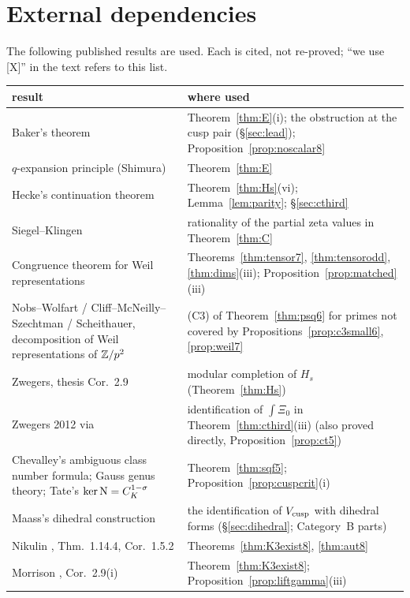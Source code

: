 \section{External dependencies}\label{sec:deps}
The following published results are used. Each is cited, not re-proved; ``we use [X]'' in the text refers to this list.
\begin{center}\small
\begin{longtable}{p{5.2cm}p{9.4cm}}\toprule
result & where used\\\midrule\endhead
Baker's theorem \cite{Baker} & Theorem~\ref{thm:E}(i); the obstruction at the cusp pair (\S\ref{sec:lead}); Proposition~\ref{prop:noscalar8}\\
$q$-expansion principle (Shimura) & Theorem~\ref{thm:E}\\
Hecke's continuation theorem \cite{Hecke} & Theorem~\ref{thm:Hs}(vi); Lemma~\ref{lem:parity}; \S\ref{sec:cthird}\\
Siegel--Klingen \cite{SiegelKlingen} & rationality of the partial zeta values in Theorem~\ref{thm:C}\\
Congruence theorem for Weil representations \cite{Weil} & Theorems~\ref{thm:tensor7}, \ref{thm:tensorodd}, \ref{thm:dims}(iii); Proposition~\ref{prop:matched}(iii)\\
Nobs--Wolfart / Cliff--McNeilly--Szechtman / Scheithauer, decomposition of Weil representations of $\mathbb{Z}/p^2$ & (C3) of Theorem~\ref{thm:psq6} for primes not covered by Propositions~\ref{prop:c3small6}, \ref{prop:weil7}\\
Zwegers, thesis Cor.~2.9 \cite{Zw} & modular completion of $H_s$ (Theorem~\ref{thm:Hs})\\
Zwegers 2012 \cite{Zw12} via \cite{BCN} & identification of $\int\Xi_0$ in Theorem~\ref{thm:cthird}(iii) (also proved directly, Proposition~\ref{prop:ct5})\\
Chevalley's ambiguous class number formula; Gauss genus theory; Tate's $\ker\mathrm{N}=C_K^{1-\sigma}$ & Theorem~\ref{thm:sqf5}; Proposition~\ref{prop:cuspcrit}(i)\\
Maass's dihedral construction \cite{Maass} & the identification of $V_{\rm cusp}$ with dihedral forms (\S\ref{sec:dihedral}; Category~B parts)\\
Nikulin \cite{Nikulin}, Thm.~1.14.4, Cor.~1.5.2 & Theorems~\ref{thm:K3exist8}, \ref{thm:aut8}\\
Morrison \cite{Morrison}, Cor.~2.9(i) & Theorem~\ref{thm:K3exist8}; Proposition~\ref{prop:liftgamma}(iii)\\

\end{longtable}
\end{center}
